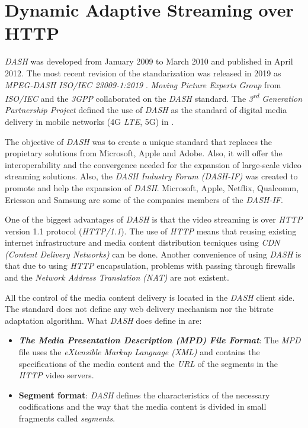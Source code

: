 \section{Dynamic Adaptive Streaming over HTTP}
\label{sec:dash}

\textit{DASH} was developed from January 2009 to March 2010 and published in April 2012. 
The most recent revision of the standarization was released in 2019 as 
\textit{MPEG-DASH ISO/IEC 23009-1:2019} \cite{ISO23009}. 
 \textit{Moving Picture Experts Group} from \textit{ISO/IEC} and the \textit{3GPP} collaborated on
the \textit{DASH} standard. The \textit{3\textsuperscript{rd} Generation Partnership Project} defined the use of
\textit{DASH} as the standard of digital media delivery in mobile networks (4G \textit{LTE}, 5G) in \cite{3gpp1}.

The objective of \textit{DASH} was to create a unique standard that replaces the propietary solutions
from Microsoft, Apple and Adobe. Also, it will offer the interoperability and the convergence needed for 
the expansion of large-scale video streaming solutions. Also, the \textit{DASH Industry Forum (DASH-IF)} was created to promote and help the expansion of
\textit{DASH}. Microsoft, Apple, Netflix, Qualcomm, Ericsson and Samsung are some of the companies
members of the \textit{DASH-IF}.

One of the biggest advantages of \textit{DASH} is that the video streaming is over \textit{HTTP} version 1.1 protocol
(\textit{HTTP/1.1}). The use of \textit{HTTP} means that reusing existing internet infrastructure and
media content distribution tecniques using \textit{CDN (Content Delivery Networks)} can be done.
Another convenience of using \textit{DASH} is that due to using \textit{HTTP} encapsulation, problems
with passing through firewalls and the \textit{Network Address Translation (NAT)}
are not existent.

All the control of the media content delivery is located in the \textit{DASH} client side. The
standard does not define any web delivery mechanism nor the bitrate adaptation algorithm. What \textit{DASH}
does define in \cite{ISO23009} are:

\begin{itemize}
  \item \textit{\textbf{The Media Presentation Description (MPD) File Format}}: The \textit{MPD} file
  uses the \textit{eXtensible Markup Language (XML)} and
  contains the specifications of the media content and the \textit{URL} of the segments
  in the \textit{HTTP} video servers.
  \item \textbf{Segment format}: \textit{DASH} defines the characteristics of the necessary
  codifications and the way that the media content is divided in small fragments called 
  \textit{segments}.
\end{itemize}


